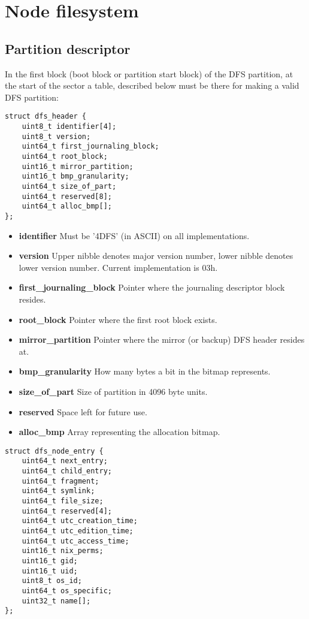 \documentclass[12pt]{article}
\begin{document}
\section{Node filesystem}

\subsection{Partition descriptor}

In the first block (boot block or partition start block) of the DFS partition, at the start of the sector a table, described below must be there for making a valid DFS partition:

\begin{verbatim}
struct dfs_header {
	uint8_t identifier[4];
	uint8_t version;
	uint64_t first_journaling_block;
	uint64_t root_block;
	uint16_t mirror_partition;
	uint16_t bmp_granularity;
	uint64_t size_of_part;
	uint64_t reserved[8];
	uint64_t alloc_bmp[];
};
\end{verbatim}

\begin{itemize}
	\item \textbf{identifier} Must be '4DFS' (in ASCII) on all implementations.
	\item \textbf{version} Upper nibble denotes major version number, lower nibble denotes lower version number. Current implementation is 03h.
	\item \textbf{first\_journaling\_block} Pointer where the journaling descriptor block resides.
	\item \textbf{root\_block} Pointer where the first root block exists.
	\item \textbf{mirror\_partition} Pointer where the mirror (or backup) DFS header resides at.
	\item \textbf{bmp\_granularity} How many bytes a bit in the bitmap represents.
	\item \textbf{size\_of\_part} Size of partition in 4096 byte units.
	\item \textbf{reserved} Space left for future use.
	\item \textbf{alloc\_bmp} Array representing the allocation bitmap.
\end{itemize}

\begin{verbatim}
struct dfs_node_entry {
	uint64_t next_entry;
	uint64_t child_entry;
	uint64_t fragment;
	uint64_t symlink;
	uint64_t file_size;
	uint64_t reserved[4];
	uint64_t utc_creation_time;
	uint64_t utc_edition_time;
	uint64_t utc_access_time;
	uint16_t nix_perms;
	uint16_t gid;
	uint16_t uid;
	uint8_t os_id;
	uint64_t os_specific;
	uint32_t name[];
};
\end{verbatim}
\end{document}
